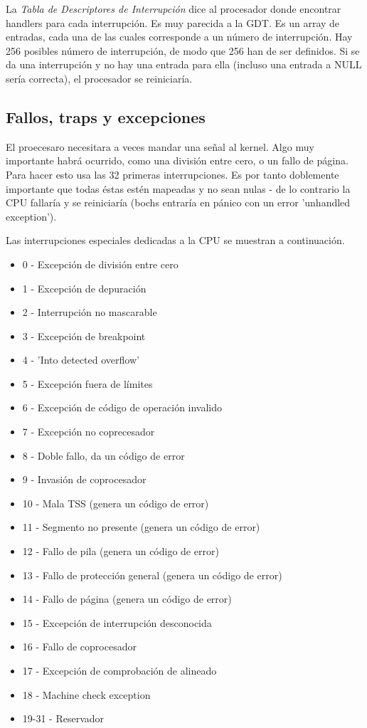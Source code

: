 \documentclass{report}
\begin{document}
La \textit{Tabla de Descriptores de Interrupción} dice al procesador donde encontrar handlers para cada interrupción. Es muy parecida a la GDT. Es un array de entradas, cada una de las cuales corresponde a un número de interrupción. Hay 256 posibles número de interrupción, de modo que 256 han de ser definidos. Si se da una interrupción y no hay una entrada para ella (incluso una entrada a NULL sería correcta), el procesador se reiniciaría.

\subsection{Fallos, traps y excepciones}

El proecesaro necesitara a veces mandar una señal al kernel. Algo muy importante habrá ocurrido, como una división entre cero, o un fallo de página. Para hacer esto usa las 32 primeras interrupciones. Es por tanto doblemente importante que todas éstas estén mapeadas y no sean nulas - de lo contrario la CPU fallaría y se reiniciaría (bochs entraría en pánico con un error 'unhandled exception').

Las interrupciones especiales dedicadas a la CPU se muestran a continuación.

\begin{itemize}
	\item 0 - Excepción de división entre cero
	\item 1 - Excepción de depuración
	\item 2 - Interrupción no mascarable
	\item 3 - Excepción de breakpoint
	\item 4 - 'Into detected overflow'
	\item 5 - Excepción fuera de límites
	\item 6 - Excepción de código de operación invalido
	\item 7 - Excepción no coprecesador
	\item 8 - Doble fallo, da un código de error
	\item 9 - Invasión  de coprocesador
	\item 10 - Mala TSS (genera un código de error)
	\item 11 - Segmento no presente (genera un código de error)
	\item 12 - Fallo de pila (genera un código de error)
	\item 13 - Fallo de protección general (genera un código de error)
	\item 14 - Fallo de página (genera un código de error)
	\item 15 - Excepción de interrupción desconocida
	\item 16 - Fallo de coprocesador
	\item 17 - Excepción de comprobación de alineado
	\item 18 - Machine check exception
	\item 19-31 - Reservador
	
\end{itemize}
\end{document}
